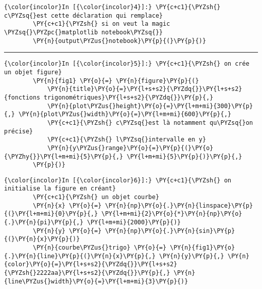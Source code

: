     \begin{Verbatim}[commandchars=\\\{\},frame=single,framerule=0.3mm,rulecolor=\color{cellframecolor}]
{\color{incolor}In [{\color{incolor}4}]:} \PY{c+c1}{\PYZsh{} c\PYZsq{}est cette déclaration qui remplace}
        \PY{c+c1}{\PYZsh{} si on veut la magic  \PYZsq{}\PYZpc{}matplotlib notebook\PYZsq{}}
        \PY{n}{output\PYZus{}notebook}\PY{p}{(}\PY{p}{)}
\end{Verbatim}


    
    
    
    
    \begin{center}\rule{0.5\linewidth}{\linethickness}\end{center}

    \begin{Verbatim}[commandchars=\\\{\},frame=single,framerule=0.3mm,rulecolor=\color{cellframecolor}]
{\color{incolor}In [{\color{incolor}5}]:} \PY{c+c1}{\PYZsh{} on crée un objet figure}
        \PY{n}{fig1} \PY{o}{=} \PY{n}{figure}\PY{p}{(}
            \PY{n}{title}\PY{o}{=}\PY{l+s+s2}{\PYZdq{}}\PY{l+s+s2}{fonctions trigonométriques}\PY{l+s+s2}{\PYZdq{}}\PY{p}{,}
            \PY{n}{plot\PYZus{}height}\PY{o}{=}\PY{l+m+mi}{300}\PY{p}{,} \PY{n}{plot\PYZus{}width}\PY{o}{=}\PY{l+m+mi}{600}\PY{p}{,}
            \PY{c+c1}{\PYZsh{} c\PYZsq{}est là notamment qu\PYZsq{}on précise}
            \PY{c+c1}{\PYZsh{} l\PYZsq{}intervalle en y}
            \PY{n}{y\PYZus{}range}\PY{o}{=}\PY{p}{(}\PY{o}{\PYZhy{}}\PY{l+m+mi}{5}\PY{p}{,} \PY{l+m+mi}{5}\PY{p}{)}\PY{p}{,}
        \PY{p}{)}
\end{Verbatim}


    \begin{Verbatim}[commandchars=\\\{\},frame=single,framerule=0.3mm,rulecolor=\color{cellframecolor}]
{\color{incolor}In [{\color{incolor}6}]:} \PY{c+c1}{\PYZsh{} on initialise la figure en créant}
        \PY{c+c1}{\PYZsh{} un objet courbe}
        \PY{n}{x} \PY{o}{=} \PY{n}{np}\PY{o}{.}\PY{n}{linspace}\PY{p}{(}\PY{l+m+mi}{0}\PY{p}{,} \PY{l+m+mi}{2}\PY{o}{*}\PY{n}{np}\PY{o}{.}\PY{n}{pi}\PY{p}{,} \PY{l+m+mi}{2000}\PY{p}{)}
        \PY{n}{y} \PY{o}{=} \PY{n}{np}\PY{o}{.}\PY{n}{sin}\PY{p}{(}\PY{n}{x}\PY{p}{)}
        \PY{n}{courbe\PYZus{}trigo} \PY{o}{=} \PY{n}{fig1}\PY{o}{.}\PY{n}{line}\PY{p}{(}\PY{n}{x}\PY{p}{,} \PY{n}{y}\PY{p}{,} \PY{n}{color}\PY{o}{=}\PY{l+s+s2}{\PYZdq{}}\PY{l+s+s2}{\PYZsh{}2222aa}\PY{l+s+s2}{\PYZdq{}}\PY{p}{,} \PY{n}{line\PYZus{}width}\PY{o}{=}\PY{l+m+mi}{3}\PY{p}{)}
\end{Verbatim}


